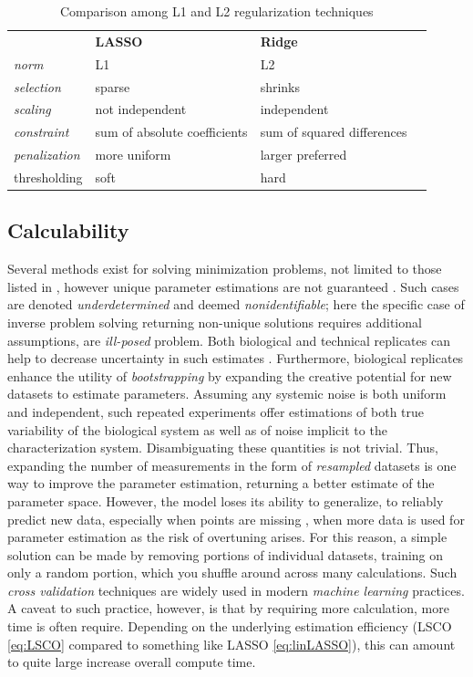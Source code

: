 \begin{table}[H]
\begin{tabular}{|l|l|l|l}
\cline{1-3}
 & \textbf{LASSO} &  \textbf{Ridge} &  \\ \cline{1-3}
\textit{norm} & L1 &  L2 &  \\ \cline{1-3}
\textit{selection} & sparse  & shrinks &  \\ \cline{1-3}
\textit{scaling} & not independent &  independent &  \\ \cline{1-3}
\textit{constraint} &sum of absolute coefficients& sum of squared differences&  \\ \cline{1-3}
\textit{penalization} & more uniform &  larger preferred &  \\ \cline{1-3}
thresholding & soft &  hard &  \\ \cline{1-3}
\end{tabular}
\caption{Comparison among L1 and L2 regularization techniques}
\label{table:regularization}
\end{table}

\subsection{Calculability}
\label{sec:calc}
Several methods exist for solving minimization problems, not limited to those listed in , however unique parameter estimations are not guaranteed \citep{candes2009near}. Such cases are denoted \emph{underdetermined} and deemed \emph{nonidentifiable}; here the specific case of inverse problem solving returning non-unique solutions requires additional assumptions, \ie are \emph{ill-posed} problem. Both biological and technical replicates can help to decrease uncertainty in such estimates \citep{lee2000importance}. Furthermore, biological replicates enhance the utility of \emph{bootstrapping} by expanding the creative potential for new datasets to estimate parameters. Assuming any systemic noise is both uniform and independent, such repeated experiments offer estimations of both true variability of the biological system as well as of noise implicit to the characterization system. Disambiguating these quantities is not trivial. Thus, expanding the number of measurements in the form of \emph{resampled} datasets is one way to improve the parameter estimation, returning a better estimate of the parameter space. However, the model loses its ability to generalize, \ie to reliably predict new data, especially when points are missing \citep{folch2015enabling}, when more data is used for parameter estimation as the risk of overtuning arises. For this reason, a simple solution can be made by removing portions of individual datasets, training on only a random portion, which you shuffle around across many calculations. Such \emph{cross validation} techniques are widely used in modern \emph{machine learning} practices. A caveat to such practice, however, is that by requiring more calculation, more time is often require. Depending on the underlying estimation efficiency (LSCO \cref{eq:LSCO} compared to something like LASSO \cref{eq:linLASSO}), this can amount to quite large increase overall compute time.


